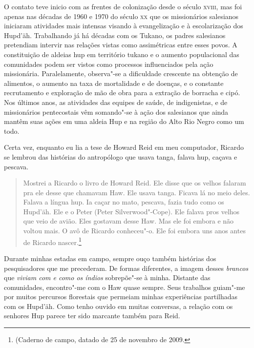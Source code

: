 
O contato teve inicio com as frentes de colonização desde o século
\textsc{xviii}, mas foi apenas nas décadas de 1960 e 1970 do século \textsc{xx} que os
missionários salesianos iniciaram atividades mais intensas visando à
evangelização e à escolarização dos Hupd'äh. Trabalhando já há décadas
com os Tukano, os padres salesianos pretendiam intervir nas relações
vistas como assimétricas entre esses povos. A constituição de aldeias
hup em território tukano e o aumento populacional das comunidades podem
ser vistos como processos influenciados pela ação missionária.
Paralelamente, observa"-se a dificuldade crescente na obtenção de
alimentos, o aumento na taxa de mortalidade e de doenças, e o constante
recrutamento e exploração de mão de obra para a extração de borracha e cipó. 
Nos últimos anos, as atividades das equipes de saúde,
de indigenistas, e de missionários pentecostais vêm somando"-se à ação
dos salesianos que ainda mantêm suas ações em uma aldeia Hup e na região
do Alto Rio Negro como um todo.

\begin{center}
\end{center}

Certa vez, enquanto eu lia a tese de Howard Reid em meu computador,
Ricardo se lembrou das histórias do antropólogo que usava tanga, falava
hup, caçava e pescava.

\begin{quote}
Mostrei a Ricardo o livro de Howard Reid. Ele disse que os velhos
falaram pra ele desse que chamavam Haw. Ele usava tanga. Ficava lá no
meio deles. Falava a língua hup. Ia caçar no mato, pescava, fazia tudo
como os Hupd'äh. Ele e o Peter (Peter Silverwood"-Cope). Ele falava pros
velhos que veio de avião. Eles gostavam desse Haw. Mas ele foi embora
e não voltou mais. O avô de Ricardo conheceu"-o. Ele foi embora uns anos
antes de Ricardo nascer.\footnote{(Caderno de campo, datado de 25 de novembro de 2009.}
\end{quote}

Durante minhas estadas em campo, sempre ouço também histórias dos
pesquisadores que me precederam. De formas diferentes, a imagem desses
\textit{brancos} que \textit{viviam com e como os índios} sobrepõe"-se à minha.
Distante das comunidades, encontro"-me com o Haw quase sempre. Seus
trabalhos guiam"-me por muitos percursos florestais que permeiam minhas
experiências partilhadas com os Hupd'äh. Como tenho ouvido em muitas
conversas, a relação com os senhores Hup parece ter sido marcante também
para Reid.


